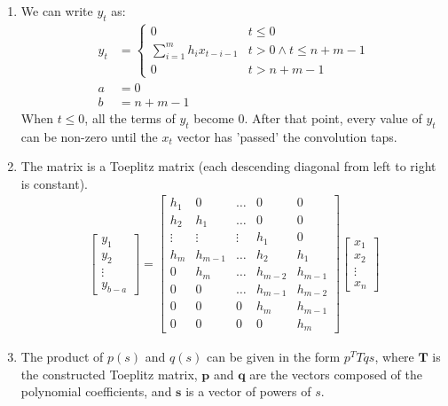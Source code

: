 \documentclass[11pt]{article}
\begin{document}
\begin{solution}
\begin{enumerate}
\item We can write $y_t$ as:
\begin{align*}
    y_t &= \begin{cases}
        0 & t \leq 0 \\
        \sum_{i=1}^{m} h_i x_{t-i-1} & t > 0 \land t \leq n + m - 1 \\
        0 & t > n + m - 1
    \end{cases} \\
    a &= 0 \\
    b &= n + m - 1
\end{align*}
When $t \leq 0$, all the terms of $y_t$ become 0. After that point, every value of $y_t$ can be non-zero until the $x_t$ vector has 'passed' the convolution taps.

\item The matrix is a Toeplitz matrix (each descending diagonal from left to right is constant).
\begin{align*}
    \begin{bmatrix}
        y_1 \\ y_2 \\ \vdots \\ y_{b-a}
    \end{bmatrix}
    =
    \begin{bmatrix}
        h_1 & 0 & \dots & 0 & 0 \\
        h_2 & h_1 & \dots & 0 & 0 \\
        \vdots & \vdots & \vdots & h_1 & 0 \\
        h_{m} & h_{m-1} & \dots & h_2 & h_1 \\
        0 & h_m & \dots & h_{m-2} & h_{m-1} \\
        0 & 0 & \dots & h_{m-1} & h_{m-2} \\
        0 & 0 & 0 & h_{m} & h_{m-1} \\
        0 & 0 & 0 & 0 & h_m
    \end{bmatrix}
    \begin{bmatrix}
        x_1 \\ x_2 \\ \vdots \\ x_n
    \end{bmatrix}
\end{align*}

\item The product of $p(s)$ and $q(s)$ can be given in the form $p^T T q s$, where $\mathbf{T}$ is the constructed Toeplitz matrix, $\mathbf{p}$ and $\mathbf{q}$ are the vectors composed of the polynomial coefficients, and $\mathbf{s}$ is a vector of powers of $s$.
\end{enumerate}
\end{solution}
\end{document}
